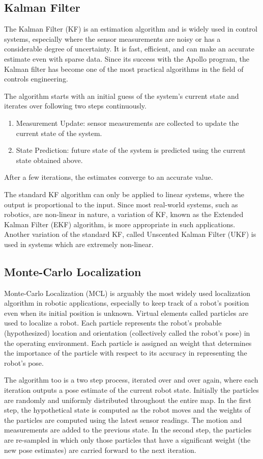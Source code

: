 \documentclass[10pt,journal,compsoc]{IEEEtran}
\begin{document}
\subsection{Kalman Filter}
The Kalman Filter (KF) is an estimation algorithm and is widely used in control systems, especially where the sensor measurements are noisy or has a considerable degree of uncertainty. It is fast, efficient, and can make an accurate estimate even with sparse data. Since its success with the Apollo program, the Kalman filter has become one of the most practical algorithms in the field of controls engineering.

The algorithm starts with an initial guess of the system's current state and iterates over following two steps continuously.
\begin{enumerate}
    \item Measurement Update: sensor measurements are collected to update the current state of the system.
    \item State Prediction: future state of the system is predicted using the current state obtained above.
\end{enumerate}
After a few iterations, the estimates converge to an accurate value.

The standard KF algorithm can only be applied to linear systems, where the output is proportional to the input. Since most real-world systems, such as robotics, are non-linear in nature, a variation of KF, known as the Extended Kalman Filter (EKF) algorithm, is more appropriate in such applications. Another variation of the standard KF, called Unscented Kalman Filter (UKF) is used in systems which are extremely non-linear.


\subsection{Monte-Carlo Localization}
Monte-Carlo Localization (MCL) is arguably the most widely used localization algorithm in robotic applications, especially to keep track of a robot's position even when its initial position is unknown. Virtual elements called particles are used to localize a robot. Each particle represents the robot's probable (hypothesized) location and orientation (collectively called the robot's pose) in the operating environment. Each particle is assigned an weight that determines the importance of the particle with respect to its accuracy in representing the robot's pose. 

The algorithm too is a two step process, iterated over and over again, where each iteration outputs a pose estimate of the current robot state. Initially the particles are randomly and uniformly distributed throughout the entire map. In the first step, the hypothetical state is computed as the robot moves and the weights of the particles are computed using the latest sensor readings. The motion and measurements are added to the previous state. In the second step, the particles are re-sampled in which only those particles that have a significant weight (the new pose estimates) are carried forward to the next iteration.
\end{document}

